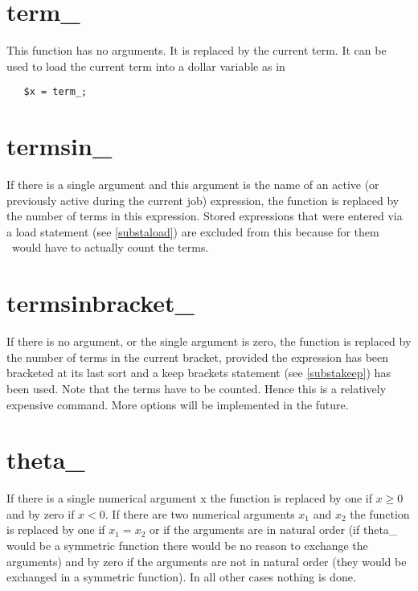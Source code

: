 
\section{term\_}
\label{funterm}
\noindent This function has no arguments. It is replaced by the current 
term. It can be used to load the current term into a dollar variable as in
\begin{verbatim}
   $x = term_;
\end{verbatim}


\section{termsin\_}
\label{funtermsin}
\noindent If there is a single argument and this argument is the name of an 
active (or previously active during the current job) expression, the 
function is replaced by the number of terms in this 
expression. Stored expressions that were entered via a load statement (see 
\ref{substaload}) are excluded from this because for them \FORM\ would have 
to actually count the terms.

 
\section{termsinbracket\_}
\label{funtermsinbracket}
\noindent If there is no argument, or the single argument is zero, the 
function is replaced by the number of terms in the current 
bracket, provided the expression has been bracketed at its 
last sort and a keep brackets statement (see \ref{substakeep}) has been 
used. Note that the terms have to be counted. Hence this is a relatively 
expensive command. More options will be implemented in the future.


\section{theta\_}
\label{funtheta}
\noindent If there is a single numerical argument x the function is 
replaced by one if $x \ge 0$ and by zero if $x < 0$. If there are two 
numerical arguments $x_1$ and $x_2$ the function is replaced by one if $x_1 
= x_2$ or if the arguments are in natural order (if theta\_ would be a 
symmetric function there would be no reason to exchange the arguments) and 
by zero if the arguments are not in natural order (they would be exchanged 
in a symmetric function). In all other cases nothing is done.

